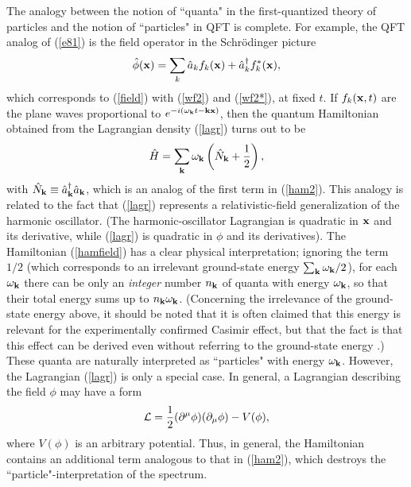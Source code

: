 \documentclass[12pt]{article}
\begin{document}
The analogy between the notion of ``quanta" in the first-quantized 
theory of particles and the notion of ``particles" in QFT is 
complete. For example, the QFT analog of (\ref{e81}) is the 
field operator in the Schr\"odinger picture
\begin{equation}
\hat{\phi}({\bf x})=\sum_k \hat{a}_k f_k({\bf x}) + 
\hat{a}_k^{\dagger} f_k^*({\bf x}) ,
\end{equation}
which corresponds to (\ref{field}) with (\ref{wf2}) and (\ref{wf2*}), 
at fixed $t$. If $f_k({\bf x},t)$ are the plane waves proportional 
to $e^{-i(\omega_{\bf k}t-{\bf k}{\bf x})}$, then 
the quantum Hamiltonian obtained from the 
Lagrangian density (\ref{lagr}) turns out to be
\begin{equation}\label{hamfield}
\hat{H}=\sum_{\bf k} \omega_{\bf k}\left(\hat{N}_{\bf k} +\frac{1}{2}
\right) ,
\end{equation}
with $\hat{N}_{\bf k}\equiv \hat{a}_{\bf k}^{\dagger} \hat{a}_{\bf k}$, 
which is an analog of the first term in (\ref{ham2}). 
This analogy is related to the fact that (\ref{lagr}) represents 
a relativistic-field generalization of the harmonic oscillator.
(The harmonic-oscillator Lagrangian is quadratic in 
${\bf x}$ and its derivative, while (\ref{lagr}) is quadratic 
in $\phi$ and its derivatives).
The Hamiltonian (\ref{hamfield}) has a clear physical interpretation;
ignoring the term $1/2$ (which corresponds to an irrelevant
ground-state energy $\sum_{\bf k} \omega_{\bf k}/2$),
for each $\omega_{\bf k}$ there can be only an {\em integer}
number $n_{\bf k}$ of quanta with energy $\omega_{\bf k}$, so that 
their total energy sums up to $n_{\bf k}\omega_{\bf k}$.
(Concerning the irrelevance of the ground-state energy above,
it should be noted that it is often claimed that this energy is relevant 
for the experimentally confirmed Casimir effect, 
but that the fact is that this effect 
can be derived even without referring to the ground-state energy
\cite{jaffe}.) 
These quanta are naturally interpreted as ``particles" with  
energy $\omega_{\bf k}$.  
However, the Lagrangian (\ref{lagr}) is only a special case.
In general, a Lagrangian describing the field $\phi$ may have a form
\begin{equation}\label{lagr2}
{\cal L}=
\frac{1}{2} (\partial^{\mu}\phi)(\partial_{\mu}\phi) -V(\phi) ,
\end{equation} 
where $V(\phi)$ is an arbitrary potential. Thus, in general, 
the Hamiltonian contains an additional term analogous to that in 
(\ref{ham2}), which destroys the ``particle"-interpretation of the 
spectrum.
\end{document}
